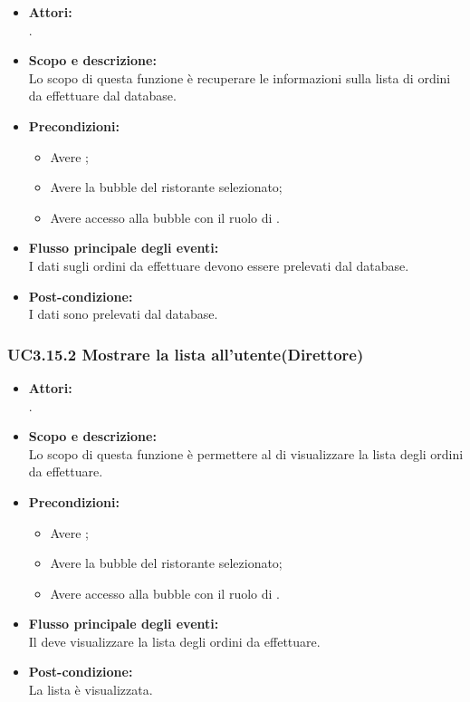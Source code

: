 \begin{itemize}
	\item \textbf{Attori:}
	\\.
	\item \textbf{Scopo e descrizione:} 
	\\Lo scopo di questa funzione è recuperare le informazioni sulla lista di ordini da effettuare dal database.
	\item \textbf{Precondizioni:}
	\begin{itemize}
		\item Avere ;
		\item Avere la bubble del ristorante selezionato;
		\item Avere accesso alla bubble con il ruolo di .
	\end{itemize}
	\item \textbf{Flusso principale degli eventi:}
	\\I dati sugli ordini da effettuare devono essere prelevati dal database.
	\item \textbf{Post-condizione:}
	\\I dati sono prelevati dal database.
\end{itemize}

\subsubsection{UC3.15.2 Mostrare la lista all’utente(Direttore)} \label{UC3.15.2}

\begin{itemize}
	\item \textbf{Attori:}
	\\.
	\item \textbf{Scopo e descrizione:} 
	\\Lo scopo di questa funzione è permettere al  di visualizzare la lista degli ordini da effettuare.
	\item \textbf{Precondizioni:}
	\begin{itemize}
		\item Avere ;
		\item Avere la bubble del ristorante selezionato;
		\item Avere accesso alla bubble con il ruolo di .
	\end{itemize}
	\item \textbf{Flusso principale degli eventi:}
	\\Il {} deve visualizzare la lista degli ordini da effettuare.
	\item \textbf{Post-condizione:}
	\\La lista è visualizzata.
\end{itemize}

